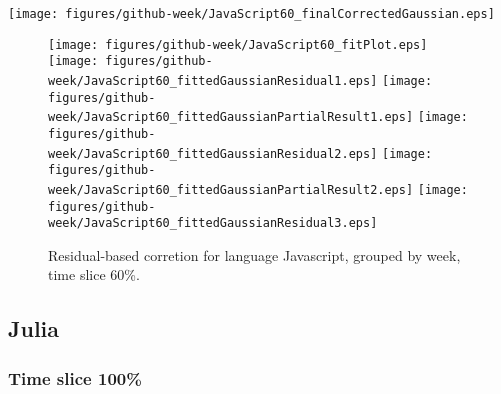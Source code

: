 \begin{center}
{\texttt{[image: figures/github-week/JavaScript60\_finalCorrectedGaussian.eps]}}
\end{center}

\FloatBarrier

\begin{figure}[t]
\centering
{}
{\texttt{[image: figures/github-week/JavaScript60\_fitPlot.eps]}}
{\texttt{[image: figures/github-week/JavaScript60\_fittedGaussianResidual1.eps]}}
{\texttt{[image: figures/github-week/JavaScript60\_fittedGaussianPartialResult1.eps]}}
{\texttt{[image: figures/github-week/JavaScript60\_fittedGaussianResidual2.eps]}}
{\texttt{[image: figures/github-week/JavaScript60\_fittedGaussianPartialResult2.eps]}}
{\texttt{[image: figures/github-week/JavaScript60\_fittedGaussianResidual3.eps]}}
\caption{Residual-based corretion for language Javascript, grouped by week, time slice 60\%.}
\end{figure}


\FloatBarrier


\subsection{Julia}

\subsubsection{Time slice 100\%}

